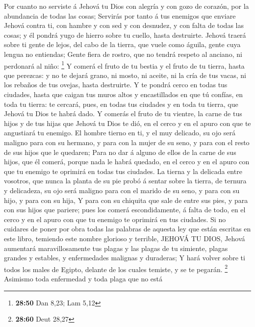  Por cuanto no serviste á Jehová tu Dios con alegría y
con gozo de corazón, por la abundancia de todas las cosas;
 Servirás por tanto á tus enemigos que enviare Jehová
contra ti, con hambre y con sed y con desnudez, y con falta de todas las
cosas; y él pondrá yugo de hierro sobre tu cuello, hasta destruirte.
 Jehová traerá sobre ti gente de lejos, del cabo de la
tierra, que vuele como águila, gente cuya lengua no entiendas;
 Gente fiera de rostro, que no tendrá respeto al anciano,
ni perdonará al niño: \footnote{\textbf{28:50} Dan 8,23; Lam 5,12}
 Y comerá el fruto de tu bestia y el fruto de tu tierra,
hasta que perezcas: y no te dejará grano, ni mosto, ni aceite, ni la
cría de tus vacas, ni los rebaños de tus ovejas, hasta destruirte.
 Y te pondrá cerco en todas tus ciudades, hasta que
caigan tus muros altos y encastillados en que tú confías, en toda tu
tierra: te cercará, pues, en todas tus ciudades y en toda tu tierra, que
Jehová tu Dios te habrá dado.  Y comerás el fruto de tu
vientre, la carne de tus hijos y de tus hijas que Jehová tu Dios te dió,
en el cerco y en el apuro con que te angustiará tu enemigo.
 El hombre tierno en ti, y el muy delicado, su ojo será
maligno para con su hermano, y para con la mujer de su seno, y para con
el resto de sus hijos que le quedaren;  Para no dar á
alguno de ellos de la carne de sus hijos, que él comerá, porque nada le
habrá quedado, en el cerco y en el apuro con que tu enemigo te oprimirá
en todas tus ciudades.  La tierna y la delicada entre
vosotros, que nunca la planta de su pie probó á sentar sobre la tierra,
de ternura y delicadeza, su ojo será maligno para con el marido de su
seno, y para con su hijo, y para con su hija,  Y para con
su chiquita que sale de entre sus pies, y para con sus hijos que
pariere; pues los comerá escondidamente, á falta de todo, en el cerco y
en el apuro con que tu enemigo te oprimirá en tus ciudades.
 Si no cuidares de poner por obra todas las palabras de
aquesta ley que están escritas en este libro, temiendo este nombre
glorioso y terrible, JEHOVÁ TU DIOS,  Jehová aumentará
maravillosamente tus plagas y las plagas de tu simiente, plagas grandes
y estables, y enfermedades malignas y duraderas;  Y hará
volver sobre ti todos los males de Egipto, delante de los cuales
temiste, y se te pegarán. \footnote{\textbf{28:60} Deut 28,27}
 Asimismo toda enfermedad y toda plaga que no está
